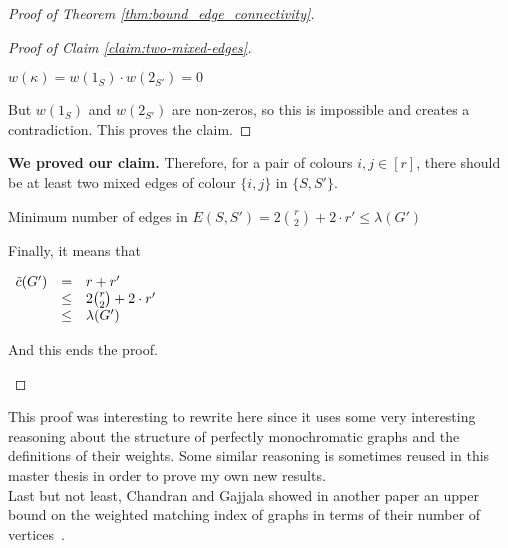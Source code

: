 \begin{proof}[Proof of Theorem \ref{thm:bound_edge_connectivity}]
\begin{enumerate}
\begin{enumerate}
\begin{proof}[Proof of Claim \ref{claim:two-mixed-edges}]
                        \begin{center}
                            $w(\kappa) = w(1_S) \cdot w(2_{S'}) = 0$
                        \end{center}
                        
                        But $w(1_S)$ and $w(2_{S'})$ are non-zeros, so this is impossible and creates a contradiction.
                        This proves the claim.
                    \end{proof}

                    \textbf{We proved our claim.}
                    Therefore, for a pair of colours $i, j \in [r]$, there should be at least two mixed edges of colour $\{i, j\}$ in $\{S, S'\}$.
                    
                    \begin{center}
                        Minimum number of edges in $E(S, S') = 2 {r \choose 2} + 2 \cdot r' \leq \lambda(G')$
                    \end{center}
                    
                    Finally, it means that
                    
                    \begin{center}
                        $\begin{array}{lcl}
                            \Tilde{c}(G') & =    & r + r' \\
                                           & \leq & 2 {r \choose 2} + 2 \cdot r' \\
                                           & \leq & \lambda(G')
                        \end{array}$
                    \end{center}
                    
                    And this ends the proof.
            \end{enumerate}
    \end{enumerate}
\end{proof}

This proof was interesting to rewrite here since it uses some very interesting reasoning about the structure of perfectly monochromatic graphs and the definitions of their weights.
Some similar reasoning is sometimes reused in this master thesis in order to prove my own new results. \\

Last but not least, Chandran and Gajjala showed in another paper an upper bound on the weighted matching index of graphs in terms of their number of vertices~\cite{chandran2023graphtheoretic}.

